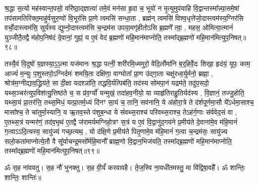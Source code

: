   श्र॒द्धा स॒त्यो मह॑स्वान्त॒पसो॒ वरि॑ष्ठा॒द्ज्ञात्वा॑ तमे॒वं मन॑सा हृ॒दा च॒ भूयो॑ न मृ॒त्युमुप॑याहि वि॒द्वान्तस्मा᳚न्न्या॒समे॒षां तप॑सामतिरिक्त॒माहु॑र्वसुर॒ण्वो॑ वि॒भूर॑सि प्रा॒णे त्वमसि॑ सन्धा॒ता \sep 
 ब्रह्म॑न् त्वमसि॑ विश्व॒धृत्ते॑जो॒दास्त्वम॑स्य॒ग्निर॑सि वर्चो॒दास्त्वम॑सि॒ सूर्य॑स्य द्युम्नो॒दास्त्वम॑सि च॒न्द्रम॑स उपया॒मगृ॑हीतोऽसि ब्र॒ह्मणे᳚ त्वा॒ \sep
 महस॒ ओमित्या॒त्मानं॑ युञ्जीतै॒तद्वै म॑होप॒निष॑दं दे॒वानां॒ गुह्यं॒ य ए॒वं वेद॑ ब्र॒ह्मणो॑ महि॒मान॑माप्नोति॒ तस्मा᳚द्ब्र॒ह्मणो॑ महि॒मान॑मित्युप॒निषत्॥९८॥\anuvakamend



तस्यै॒वं  वि॒दुषो॑ य॒ज्ञस्या॒ऽ॒ऽ॒त्मा यज॑मानः श्र॒द्धा पत्नी॒ शरी॑रमि॒ध्ममुरो॒ वेदि॒र्लोमा॑नि ब॒र्॒‌हिर्वे॒दः शिखा॒ हृद॑यं॒ यूपः॒ काम॒ आज्यं॑ म॒न्युः प॒शुस्तपो॒ऽग्निर्दमः॑ शमयि॒ता दक्षि॑णा॒ वाग्घोता᳚ प्रा॒ण उ॑द्गा॒ता चक्षु॑रध्व॒र्युर्मनो॒ ब्रह्मा॒ \sep 
श्रोत्र॑म॒ग्नीद्याव॒द्ध्रिय॑ते॒ सा दी॒क्षा यदश्ञा॑ति॒ तद्धवि॒र्यत्पिब॑ति॒ तद॑स्य सोमपा॒नं यद्रम॑ते॒ तदु॑प॒सदो॒ यथ्स॒ञ्चर॑त्युप॒विश॑त्यु॒त्तिष्ठ॑ते च॒ स प्र॑व॒र्ग्यो॑ यन्मुखं॒ तदा॑हव॒नीयो॒ या व्याहृ॑तिराहु॒तिर्यद॑स्य \sep 
वि॒ज्ञानं॒ तज्जु॒होति॒ यथ्सा॒यं प्रा॒तर॑त्ति॒ तथ्स॒मिधं॒ यत्प्रा॒तर्म॒ध्यं दि॑नꣳ सा॒यं  च॒ तानि॒ सव॑नानि॒ ये अ॑होरा॒त्रे ते द॑र्\mbox{}शपूर्णमा॒सौ ये᳚ऽर्धमा॒साश्च॒ मासा᳚श्च॒ ते चा॑तुर्मा॒स्यानि॒ य ऋ॒तव॒स्ते प॑शुब॒न्धा ये सं॑वथ्स॒राश्च॑ परिवथ्स॒राश्च॒ तेऽह॑र्ग॒णाः स॑र्ववेद॒सं वा \sep 
ए॒तथ्स॒त्रं यन्मर॑णं॒ तद॑व॒भृथ॑ ए॒तद्वै ज॑रामर्यमग्निहो॒त्रꣳ स॒त्रं य ए॒वं  वि॒द्वानु॑द॒गय॑ने प्र॒मीय॑ते दे॒वाना॑मे॒व म॑हि॒मानं॑ ग॒त्वाऽऽदि॒त्यस्य॒ सायु॑ज्यं गच्छ॒त्यथ॒ \sep
यो द॑क्षि॒णे प्र॒मीय॑ते पितृ॒णामे॒व म॑हि॒मानं॑ ग॒त्वा च॒न्द्रम॑सः॒ सायु॑ज्य सलो॒कता॑माप्नोत्ये॒तौ वै सू᳚र्याचन्द्र॒मसो᳚र्महि॒मानौ᳚ ब्राह्म॒णो वि॒द्वान॒भिज॑यति॒ तस्मा᳚द्ब्र॒ह्मणो॑ महि॒मान॑माप्नोति॒ तस्मा᳚द्ब्र॒ह्मणो॑ महि॒मान॑मित्युप॒निषत्॥९९॥
\anuvakamend

ॐ स॒ह ना॑ववतु। 
स॒ह नौ॑ भुनक्तु। 
स॒ह वी॒र्यं॑ करवावहै। 
ते॒ज॒स्वि ना॒वधी॑तमस्तु॒ मा वि॑द्विषा॒वहै᳚। 
ॐ शान्तिः॒ शान्तिः॒ शान्तिः॑॥

\closesection
\clearpage
